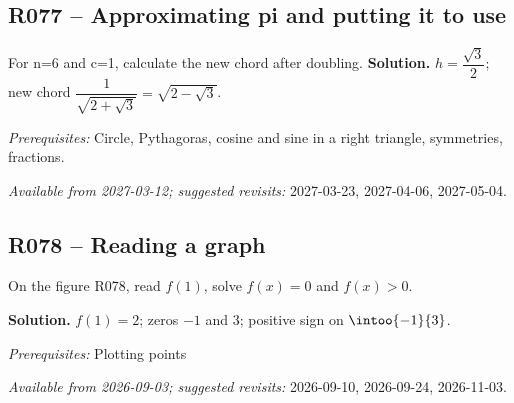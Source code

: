 \subsection*{R077 -- Approximating pi and putting it to use}\label{R077}
For n=6 and c=1, calculate the new chord after doubling.
\ifmxteacher\textbf{Solution.} $h=\dfrac{\sqrt 3}{2}$; new chord $\dfrac{1}{\sqrt {2+\sqrt3}}=\sqrt {2-\sqrt3}$.\par\textit{Prerequisites:} Circle, Pythagoras, cosine and sine in a right triangle, symmetries, fractions.\par\textit{Available from 2027-03-12; suggested revisits:} 2027-03-23, 2027-04-06, 2027-05-04.\fi
{}
\subsection*{R078 -- Reading a graph}\label{R078}
On the figure R078, read $f(1)$, solve $f(x)=0$ and $f(x)>0$.
\begin{center}\end{center}\ifmxteacher\textbf{Solution.} $f(1)=2$; zeros $-1$ and 3; positive sign on $\intoo{-1}{3}$.\par\textit{Prerequisites:} Plotting points\par\textit{Available from 2026-09-03; suggested revisits:} 2026-09-10, 2026-09-24, 2026-11-03.\fi
